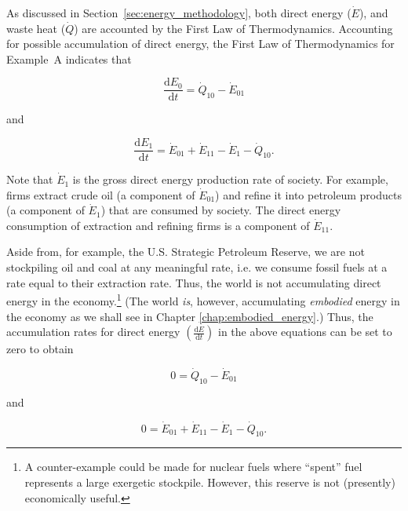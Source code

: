 As discussed in Section~\ref{sec:energy_methodology}, 
both direct energy ($\dot{E}$), and waste heat ($\dot{Q}$) 
are accounted by the First Law of Thermodynamics. 
Accounting for possible accumulation of direct energy, 
the First Law of Thermodynamics for Example~A indicates that

\begin{equation} \label{eq:dE_0/dt_single_sector}
	\frac{\mathrm{d}E_0}{\mathrm{d}t} 
	= \dot{Q}_{10} 
	- \dot{E}_{01}
\end{equation}

\noindent and

\begin{equation} \label{eq:dE_1/dt_single_sector}
	\frac{\mathrm{d}E_{1}}{\mathrm{d}t} 
	= \dot{E}_{01} 
	+ \dot{E}_{11}
	- \dot{E}_{1}
	- \dot{Q}_{10}.
\end{equation}

Note that $\dot{E}_{1}$ is the gross direct energy production rate
of society. 
For example, firms extract crude oil (a component of $\dot{E}_{01}$) 
and refine it into petroleum products (a component of $\dot{E}_{1}$)
that are consumed by society.
The direct energy consumption of extraction and refining firms 
is a component of $\dot{E}_{11}$.

Aside from, for example, the U.S. 
Strategic Petroleum Reserve, 
we are not stockpiling oil and coal at any meaningful rate, 
i.e. we consume fossil fuels at a rate equal to their extraction rate. 
Thus, the world is not accumulating direct energy 
in the economy.\footnote{A counter-example could be made 
for nuclear fuels where ``spent'' fuel represents a large exergetic stockpile. 
However, this reserve is not (presently) economically useful.} 
(The world \emph{is}, however, 
accumulating \emph{embodied} energy 
in the economy as we shall see 
in Chapter \ref{chap:embodied_energy}.) 
Thus, the accumulation rates for direct energy 
$\left( \frac{\mathrm{d}E}{\mathrm{d}t} \right)$ in the above equations 
can be set to zero to obtain

\begin{equation} \label{eq:biosphere_direct_energy_steady_state}
	0 
	= \dot{Q}_{10} 
	- \dot{E}_{01}
\end{equation}

\noindent and

\begin{equation} \label{eq:single_sector_direct_energy_steady_state}
	0 
	= \dot{E}_{01} 
	+ \dot{E}_{11}
	- \dot{E}_{1} 
	- \dot{Q}_{10}.
\end{equation}


